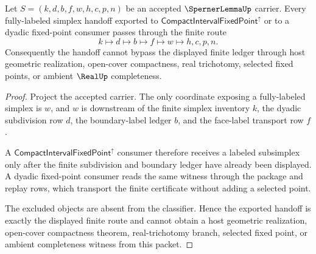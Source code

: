 \begin{theorem}
\label{thm:sperner-lemma-odd-simplex-handoff}
Let $S=(k,d,b,f,w,h,c,p,n)$ be an accepted $\SpernerLemmaUp$ carrier. Every fully-labeled simplex handoff exported to $\mathsf{CompactIntervalFixedPoint}^{\uparrow}$ or to a dyadic fixed-point consumer passes through the finite route
$$
k \longmapsto d \longmapsto b \longmapsto f \longmapsto w \longmapsto h,c,p,n.
$$
Consequently the handoff cannot bypass the displayed finite ledger through host geometric realization, open-cover compactness, real trichotomy, selected fixed points, or ambient $\RealUp$ completeness.
\end{theorem}
\begin{proof}
Project the accepted carrier. The only coordinate exposing a fully-labeled simplex is $w$, and $w$ is downstream of the finite simplex inventory $k$, the dyadic subdivision row $d$, the boundary-label ledger $b$, and the face-label transport row $f$.

A $\mathsf{CompactIntervalFixedPoint}^{\uparrow}$ consumer therefore receives a labeled subsimplex only after the finite subdivision and boundary ledger have already been displayed. A dyadic fixed-point consumer reads the same witness through the package and replay rows, which transport the finite certificate without adding a selected point.

The excluded objects are absent from the classifier. Hence the exported handoff is exactly the displayed finite route and cannot obtain a host geometric realization, open-cover compactness theorem, real-trichotomy branch, selected fixed point, or ambient completeness witness from this packet.
\end{proof}


\begin{closurestatus}{\SpernerLemmaUp}
  \theoryclosure{\seedClosure}
  \formalstatus{\unformalizedV}
\end{closurestatus}
